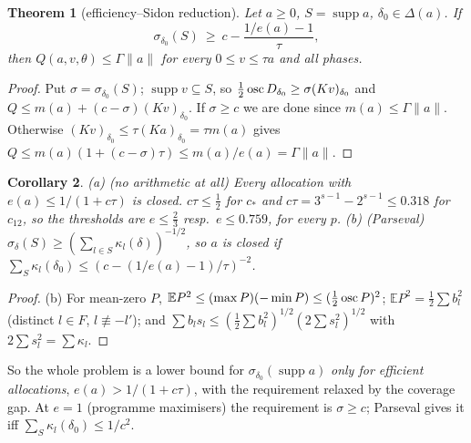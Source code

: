 \documentclass[11pt]{article}
\newtheorem{theorem}{Theorem}\newtheorem{lemma}[theorem]{Lemma}\newtheorem{proposition}[theorem]{Proposition}
\newtheorem{corollary}[theorem]{Corollary}\newtheorem{conjecture}[theorem]{Conjecture}
\theoremstyle{remark}\newtheorem{remark}[theorem]{Remark}
\begin{document}
\begin{theorem}[efficiency--Sidon reduction]\label{es}
Let $a\ge0$, $S=\operatorname{supp}a$, $\delta_0\in\Delta(a)$.  If
\[\sigma_{\delta_0}(S)\ \ge\ c-\frac{1/e(a)-1}{\tau},\]
then $Q(a,v,\theta)\le\Gamma\|a\|$ for every $0\le v\le\tau a$ and all phases.
\end{theorem}
\begin{proof}
Put $\sigma=\sigma_{\delta_0}(S)$; $\operatorname{supp}v\subseteq S$, so $\frac12\operatorname{osc} D_{\delta_0}\ge\sigma(Kv)_{\delta_0}$ and $Q\le m(a)+(c-\sigma)(Kv)_{\delta_0}$.  If $\sigma\ge c$
we are done since $m(a)\le\Gamma\|a\|$.  Otherwise $(Kv)_{\delta_0}\le\tau(Ka)_{\delta_0}=\tau m(a)$ gives $Q\le m(a)(1+(c-\sigma)\tau)\le m(a)/e(a)=\Gamma\|a\|$.
\end{proof}
\begin{corollary}\label{triv}
(a) \emph{(no arithmetic at all)} Every allocation with $e(a)\le1/(1+c\tau)$ is closed.  $c\tau\le\frac12$ for $c_*$ and $c\tau=3^{s-1}-2^{s-1}\le0.318$ for $c_{12}$,
so the thresholds are $e\le\frac23$ resp.\ $e\le0.759$, for every $p$.
(b) \emph{(Parseval)} $\sigma_\delta(S)\ge(\sum_{l\in S}\kappa_l(\delta))^{-1/2}$, so $a$ is closed if $\sum_{S}\kappa_l(\delta_0)\le(c-(1/e(a)-1)/\tau)^{-2}$.
\end{corollary}
\begin{proof}
(b) For mean-zero $P$, $\mathbb EP^2\le(\max P)(-\min P)\le(\frac12\operatorname{osc} P)^2$; $\mathbb EP^2=\frac12\sum b_l^2$ (distinct $l\in F$, $l\not\equiv-l'$); and
$\sum b_ls_l\le(\frac12\sum b_l^2)^{1/2}(2\sum s_l^2)^{1/2}$ with $2\sum s_l^2=\sum\kappa_l$.
\end{proof}
So the whole problem is a lower bound for $\sigma_{\delta_0}(\operatorname{supp}a)$ \emph{only for efficient allocations}, $e(a)>1/(1+c\tau)$, with
the requirement relaxed by the coverage gap.  At $e=1$ (programme maximisers) the requirement is $\sigma\ge c$; Parseval gives it iff
$\sum_{S}\kappa_l(\delta_0)\le1/c^2$.
\end{document}
